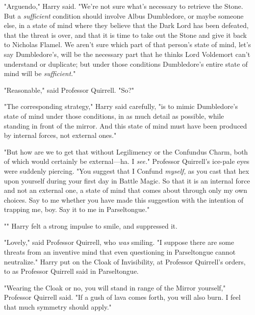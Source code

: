 "Arguendo," Harry said. "We're not sure what's necessary to retrieve the Stone.
But a \emph{sufficient} condition should involve Albus Dumbledore, or maybe
someone else, in a state of mind where they believe that the Dark Lord has been
defeated, that the threat is over, and that it is time to take out the Stone
and give it back to Nicholas Flamel. We aren't sure which part of that person's
state of mind, let's say Dumbledore's, will be the necessary part that he
thinks Lord Voldemort can't understand or duplicate; but under those conditions
Dumbledore's entire state of mind will be \emph{sufficient.}"

"Reasonable," said Professor Quirrell. "So?"

"The corresponding strategy," Harry said carefully, "is to mimic Dumbledore's
state of mind under those conditions, in as much detail as possible, while
standing in front of the mirror. And this state of mind must have been produced
by internal forces, not external ones."

"But how are we to get that without Legilimency or the Confundus Charm, both of
which would certainly be external—ha. I \emph{see.}" Professor Quirrell's
ice-pale eyes were suddenly piercing. "You suggest that I Confund
\emph{myself,} as you cast that hex upon yourself during your first day in
Battle Magic. So that it is an internal force and not an external one, a state
of mind that comes about through only my own choices. Say to me whether you
have made this suggestion with the intention of trapping me, boy. Say it to me
in Parseltongue."

"" Harry felt
a strong impulse to smile, and suppressed it.

"Lovely," said Professor Quirrell, who \emph{was} smiling. "I suppose there are
some threats from an inventive mind that even questioning in Parseltongue
cannot neutralize."
\sbreak
Harry put on the Cloak of Invisibility, at Professor Quirrell's orders, to
 as Professor Quirrell said in Parseltongue.

"Wearing the Cloak or no, you will stand in range of the Mirror yourself,"
Professor Quirrell said. "If a gush of lava comes forth, you will also burn. I
feel that much symmetry should apply."

